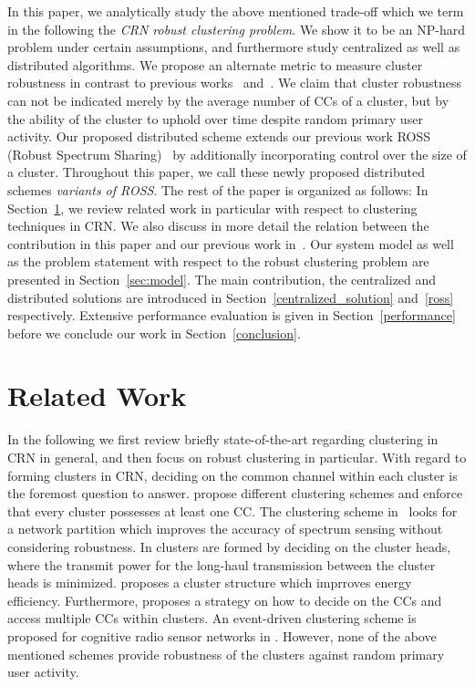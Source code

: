 \documentclass[times]{ettauth}
\theoremstyle{mytheoremstyle}
\theoremstyle{mytheoremstyle}
\theoremstyle{mytheoremstyle}
\begin{document}
In this paper, we analytically study the above mentioned trade-off which we term in the following the \textit{CRN robust clustering problem}.
We show it to be an NP-hard problem under certain assumptions, and furthermore study centralized as well as distributed algorithms.
We propose an alternate metric to measure cluster robustness in contrast to previous works~\cite{Li11_ROSS} and~\cite{LIU_TMC11_2}.
We claim that cluster robustness can not be indicated merely by the average number of CCs of a cluster, but by the ability of the cluster to uphold over time despite random primary user activity.
Our proposed distributed scheme extends our previous work ROSS (Robust Spectrum Sharing)~\cite{Li11_ROSS} by additionally incorporating control over the size of a cluster.
Throughout this paper, we call these newly proposed distributed schemes \textit{variants of ROSS}.
%
%
The rest of the paper is organized as follows:
In Section~\ref{related_work}, we review related work in particular with respect to clustering techniques in CRN.
We also discuss in more detail the relation between the contribution in this paper and our previous work in~\cite{Li11_ROSS}.
Our system model as well as the problem statement with respect to the robust clustering problem are presented in Section~\ref{sec:model}. 
The main contribution, the centralized and distributed solutions are introduced in Section~\ref{centralized_solution} and~\ref{ross} respectively.
Extensive performance evaluation is given in Section~\ref{performance} before we conclude our work in Section~\ref{conclusion}.

\section{Related Work}
\label{related_work}
In the following we first review briefly state-of-the-art regarding clustering in CRN in general, and then focus on robust clustering in particular.
With regard to forming clusters in CRN, deciding on the common channel within each cluster is the foremost question to answer.
\cite{Zhao07, Chen07,Affinity_clustering_09icccn} propose different clustering schemes and enforce that every cluster possesses at least one CC.
The clustering scheme in~\cite{Consensus_based_clustering12} looks for a network partition which improves the accuracy of spectrum sensing without considering robustness.
In \cite{TWC2012_cooperative_communication} clusters are formed by deciding on the cluster heads, where the transmit power for the long-haul transmission between the cluster heads is minimized.
\cite{clustering_globecom11} proposes a cluster structure which imprroves energy efficiency.
Furthermore, \cite{cluster_EW10} proposes a strategy on how to decide on the CCs and access multiple CCs within clusters.
An event-driven clustering scheme is proposed for cognitive radio sensor networks in \cite{Ozger_cluster_crsn_13}.
However, none of the above mentioned schemes provide robustness of the clusters against random primary user activity.
\end{document}

